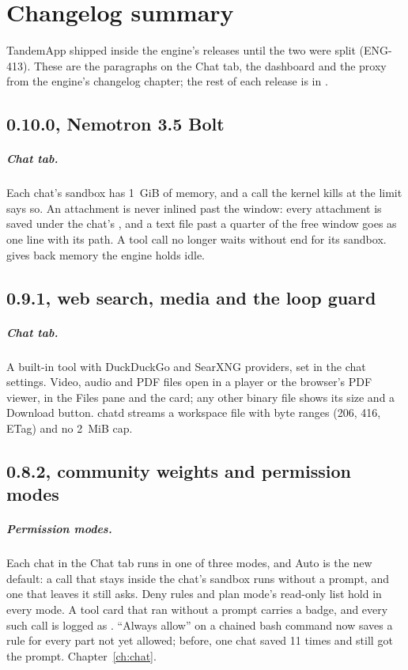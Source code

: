 \chapter{Changelog summary}\label{ch:changelog}

TandemApp shipped inside the engine's releases until the two were split (ENG-413). These are the paragraphs on the Chat tab, the dashboard and the proxy from the engine's changelog chapter; the rest of each release is in .

\section*{0.10.0, Nemotron 3.5 Bolt}

\paragraph{Chat tab.} Each chat's sandbox has 1~GiB of memory, and a call the kernel kills at the limit says so. An attachment is never inlined past the window: every attachment is saved under the chat's , and a text file past a quarter of the free window goes as one line with its path. A tool call no longer waits without end for its sandbox.  gives back memory the engine holds idle.

\section*{0.9.1, web search, media and the loop guard}

\paragraph{Chat tab.} A built-in  tool with DuckDuckGo and SearXNG providers, set in the chat settings. Video, audio and PDF files open in a player or the browser's PDF viewer, in the Files pane and the  card; any other binary file shows its size and a Download button. chatd streams a workspace file with byte ranges (206, 416, ETag) and no 2~MiB cap.

\section*{0.8.2, community weights and permission modes}

\paragraph{Permission modes.} Each chat in the Chat tab runs in one of three modes, and Auto is the new default: a call that stays inside the chat's sandbox runs without a prompt, and one that leaves it still asks. Deny rules and plan mode's read-only list hold in every mode. A tool card that ran without a prompt carries a badge, and every such call is logged as . \enquote{Always allow} on a chained bash command now saves a rule for every part not yet allowed; before, one chat saved  11 times and still got the prompt. Chapter~\ref{ch:chat}.

